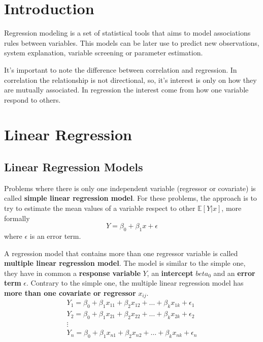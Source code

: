 \section{Introduction}
Regression modeling is a set of statistical tools that aims to model associations
rules between variables. This models can be later use to predict new observations,
system explanation, variable screening or parameter estimation.

It's important to note the difference between correlation and regression. In correlation
the relationship is not directional, so, it's interest is only on how they are mutually
associated. In regression the interest come from how one variable respond to others.

\section{Linear Regression}
\subsection{Linear Regression Models}
Problems where there is only one independent variable (regressor or covariate) is called 
\textbf{simple linear regression model}. For these problems, the approach is to try to 
estimate the mean values of a variable respect to other $\mathbb{E}[Y|x]$, more formally
\begin{equation}
    Y = \beta_0 + \beta_1 x + \epsilon
\end{equation}
where $\epsilon$ is an error term.

A regression model that contains more than one regressor variable is called
\textbf{multiple linear regression model}. The model is similar to the simple
one, they have in common a \textbf{response variable} $Y$, an \textbf{intercept}
$beta_0$ and an \textbf{error term} $\epsilon$. Contrary to the simple one, the multiple linear
regression model has \textbf{more than one covariate or regressor} $x_{ij}$.
\begin{gather*}
    Y_1 = \beta_0 + \beta_1 x_{11} + \beta_2 x_{12} + \dots + \beta_k x_{1k} + \epsilon_1\\
    Y_2 = \beta_0 + \beta_1 x_{21} + \beta_2 x_{22} + \dots + \beta_k x_{2k} + \epsilon_2\\
    \vdots\\
    Y_n = \beta_0 + \beta_1 x_{n1} + \beta_2 x_{n2} + \dots + \beta_k x_{nk} + \epsilon_n\\
\end{gather*}

